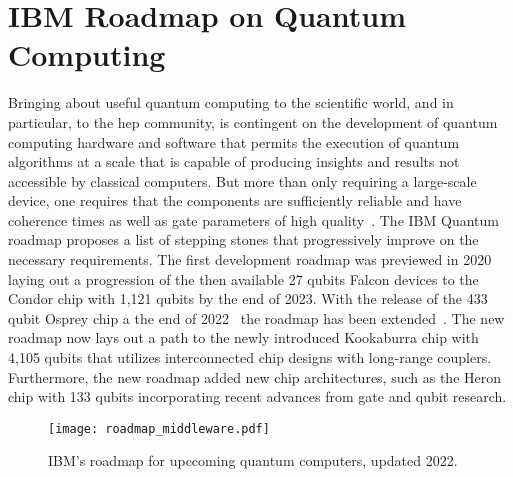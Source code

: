 \section{IBM Roadmap on Quantum Computing\label{sec:ibm_roadmap}}

Bringing about useful quantum computing to the scientific world, and in particular, to the \gls{hep} community, is contingent on the development of quantum computing hardware and software that permits the execution of quantum algorithms at a scale that is capable of producing insights and results not accessible by classical computers. But more than only requiring a large-scale device, one requires that the components are sufficiently reliable and have coherence times as well as gate parameters of high quality~\cite{wack2021quality}. The IBM Quantum roadmap proposes a list of stepping stones that progressively improve on the necessary requirements. The first development roadmap was previewed in 2020~\cite{IBM_roadmap1} laying out a progression of the then available 27 qubits Falcon devices to the Condor chip with 1,121 qubits by the end of 2023. With the release of the 433 qubit Osprey chip a the end of 2022~\cite{OspreyIBMnews} the roadmap has been extended~\cite{IBM_roadmap2}. %
The new roadmap now lays out a path to the newly introduced Kookaburra chip with 4,105 qubits that utilizes interconnected chip designs with long-range couplers. Furthermore, the new roadmap added new chip architectures, such as the Heron chip with 133 qubits incorporating recent advances from gate and qubit research.
%
\begin{figure*}
    \centering
    \texttt{[image: roadmap\_middleware.pdf]}
    \caption{IBM's roadmap for upccoming quantum computers, updated 2022.}
    \label{fig:roadmap}
\end{figure*}

